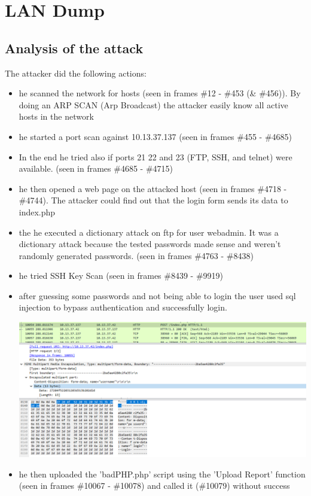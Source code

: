 \section{LAN Dump}
\subsection{Analysis of the attack}
The attacker did the following actions:
\begin{itemize}
    \item he scanned the network for hosts (seen in frames \#12 - \#453 (\& \#456)). By doing an ARP SCAN (Arp Broadcast) the attacker easily know all active hosts in the network 
    \item he started a port scan against 10.13.37.137 (seen in frames \#455 - \#4685)
    \item In the end he tried also if ports 21 22 and 23 (FTP, SSH, and telnet) were available. (seen in frames \#4685 - \#4715)
    \item he then opened a web page on the attacked host (seen in frames \#4718 - \#4744). The attacker could find out that the login form sends its data to index.php
    \item the he executed a dictionary attack on ftp for user webadmin. It was a dictionary attack because the tested passwords made sense and weren't randomly generated passwords. (seen in frames \#4763 - \#8438)
    \item he tried SSH Key Scan (seen in frames \#8439 - \#9919)
    \item after guessing some passwords and not being able to login the user used sql injection to bypass authentication and successfully login.
    \begin{center}
        \includegraphics{imgs/sqlinjecton.PNG}
    \end{center}
    \item he then uploaded the 'badPHP.php' script using the 'Upload Report' function (seen in frames \#10067 - \#10078) and called it (\#10079) without success

\end{itemize}
